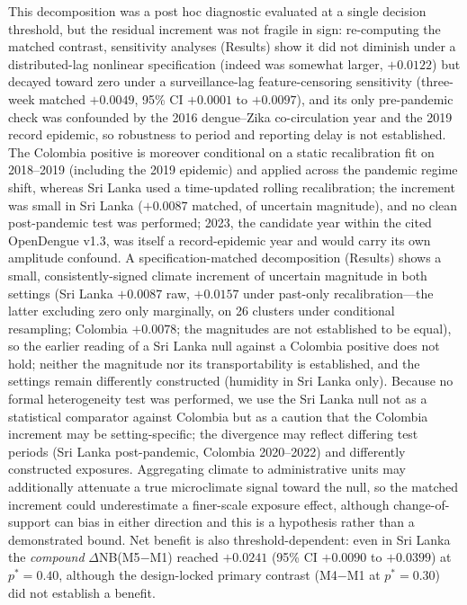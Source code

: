 \documentclass[11pt,a4paper]{article}
\begin{document}
This decomposition was a post hoc diagnostic evaluated at a single decision threshold, but the residual increment was not fragile in sign: re-computing the matched contrast, sensitivity analyses (Results) show it did not diminish under a distributed-lag nonlinear specification (indeed was somewhat larger, $+0.0122$) but decayed toward zero under a surveillance-lag feature-censoring sensitivity (three-week matched $+0.0049$, 95\% CI $+0.0001$ to $+0.0097$), and its only pre-pandemic check was confounded by the 2016 dengue--Zika co-circulation year and the 2019 record epidemic, so robustness to period and reporting delay is not established. The Colombia positive is moreover conditional on a static recalibration fit on 2018--2019 (including the 2019 epidemic) and applied across the pandemic regime shift, whereas Sri Lanka used a time-updated rolling recalibration; the increment was small in Sri Lanka ($+0.0087$ matched, of uncertain magnitude), and no clean post-pandemic test was performed; 2023, the candidate year within the cited OpenDengue v1.3, was itself a record-epidemic year and would carry its own amplitude confound. A specification-matched decomposition (Results) shows a small, consistently-signed climate increment of uncertain magnitude in both settings (Sri Lanka $+0.0087$ raw, $+0.0157$ under past-only recalibration---the latter excluding zero only marginally, on 26 clusters under conditional resampling; Colombia $+0.0078$; the magnitudes are not established to be equal), so the earlier reading of a Sri Lanka null against a Colombia positive does not hold; neither the magnitude nor its transportability is established, and the settings remain differently constructed (humidity in Sri Lanka only). Because no formal heterogeneity test was performed, we use the Sri Lanka null not as a statistical comparator against Colombia but as a caution that the Colombia increment may be setting-specific; the divergence may reflect differing test periods (Sri Lanka post-pandemic, Colombia 2020--2022) and differently constructed exposures. Aggregating climate to administrative units may additionally attenuate a true microclimate signal toward the null, so the matched increment could underestimate a finer-scale exposure effect, although change-of-support can bias in either direction and this is a hypothesis rather than a demonstrated bound. Net benefit is also threshold-dependent: even in Sri Lanka the \emph{compound} $\Delta$NB(M5$-$M1) reached $+0.0241$ (95\% CI $+0.0090$ to $+0.0399$) at $p^*=0.40$, although the design-locked primary contrast (M4$-$M1 at $p^*=0.30$) did not establish a benefit.
\end{document}
